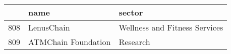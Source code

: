 \begin{tabular}{lll}
\toprule
{} &                 name &                         sector \\
\midrule
808 &           LenusChain &  Wellness and Fitness Services \\
809 &  ATMChain Foundation &                       Research \\
\bottomrule
\end{tabular}
